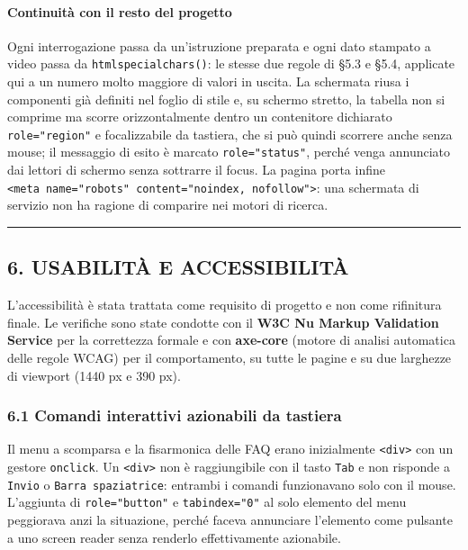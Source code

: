 \documentclass[
  11pt,
]{article}
\begin{document}
\hypertarget{continuituxe0-con-il-resto-del-progetto}{%
\paragraph{Continuità con il resto del
progetto}\label{continuituxe0-con-il-resto-del-progetto}}

Ogni interrogazione passa da un'istruzione preparata e ogni dato
stampato a video passa da \texttt{htmlspecialchars()}: le stesse due
regole di §5.3 e §5.4, applicate qui a un numero molto maggiore di
valori in uscita. La schermata riusa i componenti già definiti nel
foglio di stile e, su schermo stretto, la tabella non si comprime ma
scorre orizzontalmente dentro un contenitore dichiarato
\texttt{role="region"} e focalizzabile da tastiera, che si può quindi
scorrere anche senza mouse; il messaggio di esito è marcato
\texttt{role="status"}, perché venga annunciato dai lettori di schermo
senza sottrarre il focus. La pagina porta infine
\texttt{\textless{}meta\ name="robots"\ content="noindex,\ nofollow"\textgreater{}}:
una schermata di servizio non ha ragione di comparire nei motori di
ricerca.

\begin{center}\rule{0.5\linewidth}{0.5pt}\end{center}

\hypertarget{usabilituxe0-e-accessibilituxe0}{%
\subsection{6. USABILITÀ E
ACCESSIBILITÀ}\label{usabilituxe0-e-accessibilituxe0}}

L'accessibilità è stata trattata come requisito di progetto e non come
rifinitura finale. Le verifiche sono state condotte con il \textbf{W3C
Nu Markup Validation Service} per la correttezza formale e con
\textbf{axe-core} (motore di analisi automatica delle regole WCAG) per
il comportamento, su tutte le pagine e su due larghezze di viewport
(1440 px e 390 px).

\hypertarget{comandi-interattivi-azionabili-da-tastiera}{%
\subsubsection{6.1 Comandi interattivi azionabili da
tastiera}\label{comandi-interattivi-azionabili-da-tastiera}}

Il menu a scomparsa e la fisarmonica delle FAQ erano inizialmente
\texttt{\textless{}div\textgreater{}} con un gestore \texttt{onclick}.
Un \texttt{\textless{}div\textgreater{}} non è raggiungibile con il
tasto \texttt{Tab} e non risponde a \texttt{Invio} o
\texttt{Barra\ spaziatrice}: entrambi i comandi funzionavano solo con il
mouse. L'aggiunta di \texttt{role="button"} e \texttt{tabindex="0"} al
solo elemento del menu peggiorava anzi la situazione, perché faceva
annunciare l'elemento come pulsante a uno screen reader senza renderlo
effettivamente azionabile.
\end{document}

